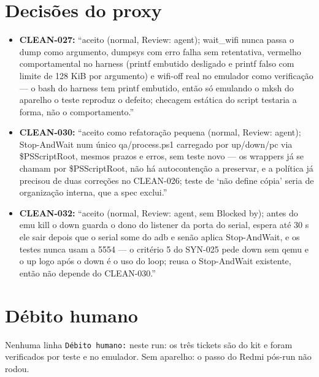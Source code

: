 \documentclass[11pt,a4paper]{article}
\begin{document}
\section{Decisões do proxy}
\begin{itemize}
  \item \textbf{CLEAN-027:} ``aceito (normal, Review: agent); wait\_wifi nunca
        passa o dump como argumento, dumpsys com erro falha sem retentativa,
        vermelho comportamental no harness (printf embutido desligado e printf
        falso com limite de 128 KiB por argumento) e wifi-off real no emulador
        como verificação --- o bash do harness tem printf embutido, então só
        emulando o mksh do aparelho o teste reproduz o defeito; checagem
        estática do script testaria a forma, não o comportamento.''
  \item \textbf{CLEAN-030:} ``aceito como refatoração pequena (normal, Review:
        agent); Stop-AndWait num único qa/process.ps1 carregado por up/down/pc
        via \$PSScriptRoot, mesmos prazos e erros, sem teste novo --- os
        wrappers já se chamam por \$PSScriptRoot, não há autocontenção a
        preservar, e a política já precisou de duas correções no CLEAN-026;
        teste de `não define cópia' seria de organização interna, que a spec
        exclui.''
  \item \textbf{CLEAN-032:} ``aceito (normal, Review: agent, sem Blocked by);
        antes do emu kill o down guarda o dono do listener da porta do serial,
        espera até 30 s ele sair depois que o serial some do adb e senão aplica
        Stop-AndWait, e os testes nunca usam a 5554 --- o critério 5 do SYN-025
        pede down sem qemu e o up logo após o down é o uso do loop; reusa o
        Stop-AndWait existente, então não depende do CLEAN-030.''
\end{itemize}

\section{Débito humano}
Nenhuma linha \texttt{Débito humano:} neste run: os três tickets são do kit e
foram verificados por teste e no emulador. Sem aparelho: o passo do Redmi
pós-run não rodou.
\end{document}
